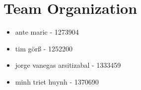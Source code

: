 
\chapter{\centering Team Organization}
\begin{itemize}
    \item ante maric                - 1273904
    \item tim görß                  - 1252200
	\item jorge vanegas arsitizabal - 1333459
	\item minh triet huynh          - 1370690
\end{itemize}